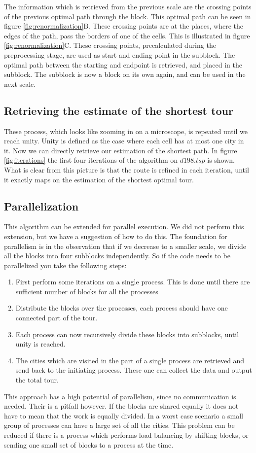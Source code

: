 The information which is retrieved from the previous scale are the crossing points of the previous optimal path through the block. This optimal path can be seen in figure \ref{fig:renormalization}B.  These crossing points are at the places, where the edges of the path, pass the borders of one of the cells. This is illustrated in figure \ref{fig:renormalization}C. These crossing points, precalculated during the preprocessing stage, are used as start and ending point in the subblock. The optimal path between the starting and endpoint is retrieved, and placed in the subblock. The subblock is now a block on its own again, and can be used in the next scale.

\subsection{Retrieving the estimate of the shortest tour}
These process, which looks like zooming in on a microscope, is repeated until we reach unity. Unity is defined as the case where each cell has at most one city in it. Now we can directly retrieve our estimation of the shortest path. In figure \ref{fig:iterations} the first four iterations of the algorithm on $d198.tsp$ is shown. What is clear from this picture is that the route is refined in each iteration, until it exactly maps on the estimation  of the shortest optimal tour.

\subsection{Parallelization}
This algorithm can be extended for parallel execution. We did not perform this extension, but we have a suggestion of how to do this. The foundation for parallelism is in the observation that if we decrease to a smaller scale, we divide all the blocks into four subblocks independently. So if the code needs to be parallelized you take the following steps:

\begin{enumerate}
\item First perform some iterations on a single process. This is done until there are sufficient number of blocks for all the processes
\item Distribute the blocks over the processes, each process should have one connected part of the tour.
\item Each process can now recursively divide these blocks into subblocks, until unity is reached.
\item The cities which are visited in the part of a single process are retrieved and send back to the initiating process. These one can collect the data and output the total tour.
\end{enumerate}

This approach has a high potential of parallelism, since no communication is needed. Their is a pitfall however. If the blocks are shared equally it does not have to mean that the work is equally divided. In a worst case scenario a small group of processes can have a large set of all the cities. This problem can be reduced if there is a process which performs load balancing by shifting blocks, or sending one small set of blocks to a process at the time.
